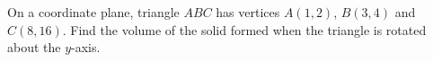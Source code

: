 On a coordinate plane, triangle $ABC$ has vertices $A(1,2)$, $B(3,4)$ and $C(8,16)$. Find the volume of the solid formed when the triangle is rotated about the $y$-axis.
